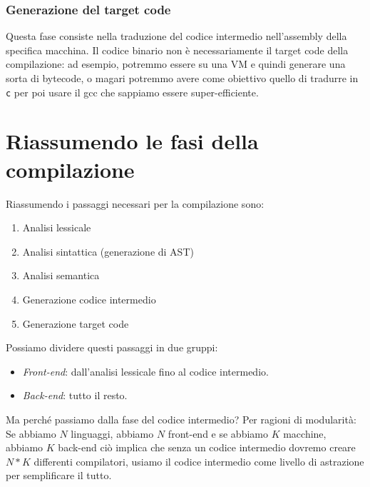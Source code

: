 \documentclass[class=book, crop=false, oneside, 12pt]{standalone}
\begin{document}
\subsubsection{Generazione del target code}
Questa fase consiste nella traduzione del codice intermedio nell’assembly della specifica macchina. Il codice binario non è necessariamente il target code della compilazione: ad esempio, potremmo essere su una VM e quindi generare una sorta di bytecode, o magari potremmo avere come obiettivo quello di tradurre in \texttt{c} per poi usare il gcc che sappiamo essere super-efficiente.

\section{Riassumendo le fasi della compilazione}
Riassumendo i passaggi necessari per la compilazione sono:
\begin{enumerate}
    \item Analisi lessicale
    \item Analisi sintattica (generazione di AST)
    \item Analisi semantica
    \item Generazione codice intermedio
    \item Generazione target code
\end{enumerate}
Possiamo dividere questi passaggi in due gruppi:
\begin{itemize}[]
    \item \emph{Front-end}: dall’analisi lessicale fino al codice intermedio.
    \item \emph{Back-end}: tutto il resto.
\end{itemize}
Ma perché passiamo dalla fase del codice intermedio? Per ragioni di modularità:
Se abbiamo \(N\) linguaggi, abbiamo \(N\) front-end e se abbiamo \(K\) macchine, abbiamo \(K\) back-end ciò implica che senza un codice intermedio dovremo creare \(N*K\) differenti compilatori, usiamo il codice intermedio come livello di astrazione per semplificare il tutto. 
\end{document}
